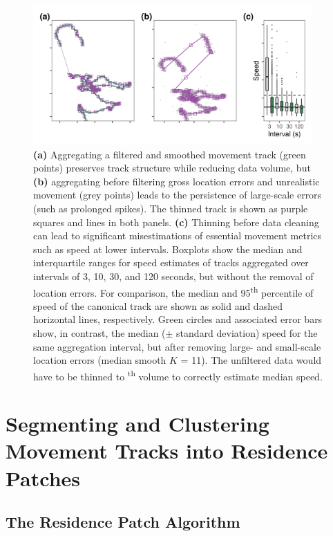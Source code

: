 \documentclass[10pt,paper=a4,headings=standardclasses
]{scrartcl}
\begin{document}
\begin{figure}[h!]
    \centering
    \includegraphics[width=0.95\textwidth]{figures/fig_04_thinning.png}
    \caption{\textbf{(a)} Aggregating a filtered and smoothed movement track (green points) preserves track structure while reducing data volume, but \textbf{(b)} aggregating before filtering gross location errors and unrealistic movement (grey points) leads to the persistence of large-scale errors (such as prolonged spikes).
    The thinned track is shown as purple squares and lines in both panels.
    \textbf{(c)} Thinning before data cleaning can lead to significant misestimations of essential movement metrics such as speed at lower intervals.
    Boxplots show the median and interquartile ranges for speed estimates of tracks aggregated over intervals of 3, 10, 30, and 120 seconds, but without the removal of location errors.
    For comparison, the median and 95\textsuperscript{th} percentile of speed of the canonical track are shown as solid and dashed horizontal lines, respectively.
    Green circles and associated error bars show, in contrast, the median ($\pm$ standard deviation) speed for the same aggregation interval, but after removing large- and small-scale location errors (median smooth $K$ = 11).
    The unfiltered data would have to be thinned to \textsuperscript{th} volume to correctly estimate median speed.}
    \label{fig:figure_thinning}
\end{figure}

\section{Segmenting and Clustering Movement Tracks into Residence Patches}

\subsection{The Residence Patch Algorithm}
\end{document}
